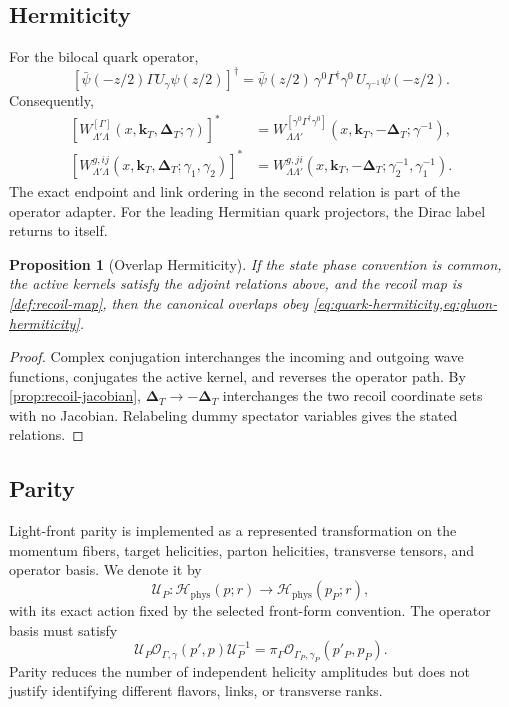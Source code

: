 \documentclass[11pt]{article}
\newtheorem{proposition}[definition]{Proposition}
\newcommand{\kT}{\bm{k}_{T}}
\newcommand{\DT}{\bm{\Delta}_{T}}
\newcommand{\Hil}{\mathcal H}
\newcommand{\cO}{\mathcal O}
\newcommand{\cU}{\mathcal U}
\begin{document}
\subsection{Hermiticity}

For the bilocal quark operator,
\begin{equation}
 \left[\bar\psi(-z/2)\Gamma U_\gamma\psi(z/2)\right]^\dagger
 =\bar\psi(z/2)\,
 \gamma^0\Gamma^\dagger\gamma^0\,
 U_{\gamma^{-1}}\psi(-z/2).
\label{eq:bilocal-dagger}
\end{equation}
Consequently,
\begin{align}
 \left[W_{\Lambda'\Lambda}^{[\Gamma]}
 (x,\kT,\DT;\gamma)\right]^*
 &=W_{\Lambda\Lambda'}^{[\gamma^0\Gamma^\dagger\gamma^0]}
 (x,\kT,-\DT;\gamma^{-1}),
\label{eq:quark-hermiticity}\\
 \left[W_{\Lambda'\Lambda}^{g,ij}
 (x,\kT,\DT;\gamma_1,\gamma_2)\right]^*
 &=W_{\Lambda\Lambda'}^{g,ji}
 (x,\kT,-\DT;\gamma_2^{-1},\gamma_1^{-1}).
\label{eq:gluon-hermiticity}
\end{align}
The exact endpoint and link ordering in the second relation is part of the
operator adapter.  For the leading Hermitian quark projectors, the Dirac
label returns to itself.

\begin{proposition}[Overlap Hermiticity]
\label{prop:overlap-hermiticity}
If the state phase convention is common, the active kernels satisfy the
adjoint relations above, and the recoil map is
\cref{def:recoil-map}, then the canonical overlaps obey
\cref{eq:quark-hermiticity,eq:gluon-hermiticity}.
\end{proposition}

\begin{proof}
Complex conjugation interchanges the incoming and outgoing wave functions,
conjugates the active kernel, and reverses the operator path.  By
\cref{prop:recoil-jacobian}, \(\DT\to-\DT\) interchanges the two recoil
coordinate sets with no Jacobian.  Relabeling dummy spectator variables gives
the stated relations.
\end{proof}

\subsection{Parity}

Light-front parity is implemented as a represented transformation on the
momentum fibers, target helicities, parton helicities, transverse tensors,
and operator basis.  We denote it by
\begin{equation}
 \cU_P:\Hil_{\mathrm{phys}}(p;r)\to\Hil_{\mathrm{phys}}(p_P;r),
\label{eq:lf-parity-map}
\end{equation}
with its exact action fixed by the selected front-form convention.  The
operator basis must satisfy
\begin{equation}
 \cU_P\cO_{\Gamma,\gamma}(p',p)\cU_P^{-1}
 =\pi_\Gamma\cO_{\Gamma_P,\gamma_P}(p'_P,p_P).
\label{eq:parity-operator}
\end{equation}
Parity reduces the number of independent helicity amplitudes but does not
justify identifying different flavors, links, or transverse ranks.
\end{document}
